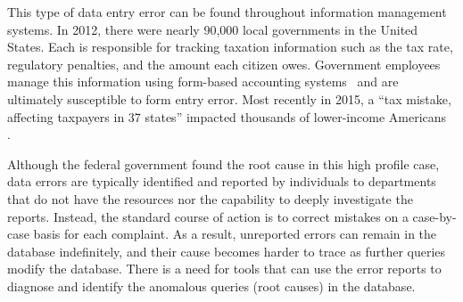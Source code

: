 This type of data entry error can be found throughout information management systems.  In 2012, there were nearly 90,000 local governments in the United States.  Each is responsible for tracking taxation information such as the tax rate, regulatory penalties, and the amount each citizen owes.  Government employees manage this information using form-based accounting systems~\cite{reutersmanagement} and are ultimately susceptible to form entry error.  Most recently in 2015, a ``tax mistake, affecting taxpayers in 37 states'' impacted thousands of lower-income Americans~\cite{nyt-tax-article} .    

Although the federal government found the root cause in this high profile case, data errors are typically identified and reported by individuals to departments that do not have the resources nor the capability to deeply investigate the reports.     Instead, the standard course of action is to correct mistakes on a case-by-case basis for each complaint.  As a result, unreported errors can remain in the database indefinitely, and their cause becomes harder to trace as further queries modify the database.   There is a need for tools that can use the error reports to diagnose and identify the anomalous queries (root causes) in the database.   


